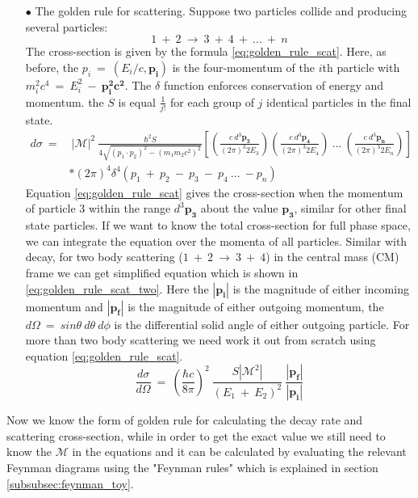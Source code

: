 \begin{itemize}
\item[$\bullet$] The golden rule for scattering.
 Suppose two particles collide and producing several particles:
 \begin{equation}
1~+~2~\rightarrow~3~+~4~+~...~+~n
 \label{eq:two_scat}
\end{equation}
The cross-section is given by the formula \ref{eq:golden_rule_scat}. Here, as before, the $p_{i}~=~(E_{i}/c,\mathbf{p_{i}})$ is the four-momentum of the $i$th particle with $m_{i}^{2}c^{4}~=~E_{i}^{2}~-~\mathbf{p_{i}^{2}c^{2}}$. The $\delta$ function enforces conservation of energy and momentum. the $S$ is equal $\frac{1}{j!}$ for each group of $j$ identical particles in the final state.
\begin{equation}
\begin{split}
d\sigma~=&~|\mathcal{M}|^{2}~\frac{\hbar^{2}S}{4\sqrt{(p_{1}\cdot p_{2})^{2}-(m_{1}m_{2}c^{2})^{2}}}[(\frac{c~d^{3}\mathbf{p_{3}}}{(2\pi)^{3}2E_{3}})(\frac{c~d^{3}\mathbf{p_{4}}}{(2\pi)^{3}2E_{4}})~...~(\frac{c~d^{3}\mathbf{p_{n}}}{(2\pi)^{3}2E_{n}})]\\
&*(2\pi)^{4}\delta^{4}(p_{1}~+~p_{2}~-~p_{3}~-~p_{4}~...~-p_{n})
\end{split}
\label{eq:golden_rule_scat}
\end{equation}
Equation \ref{eq:golden_rule_scat} gives the cross-section when the momentum of particle 3 within the range $d^{3}\mathbf{p_{3}}$ about the value $\mathbf{p_{3}}$, similar for other final state particles. If we want to know the total cross-section for full phase space, we can integrate the equation over the momenta of all particles.
Similar with decay, for two body scattering ($1~+~2~\rightarrow~3~+~4$) in the central mass (CM) frame we can get simplified equation which is shown in \ref{eq:golden_rule_scat_two}. Here the $|\mathbf{p_{i}}|$ is the magnitude of either incoming momentum and $|\mathbf{p_{f}}|$ is the magnitude of either outgoing momentum, the $d\Omega~=~sin\theta~d\theta~d\phi$ is the differential solid angle of either outgoing particle. For more than two body scattering we need work it out from scratch using equation \ref{eq:golden_rule_scat}.
\begin{equation}
\frac{d\sigma}{d\Omega}~=~(\frac{\hbar c}{8\pi})^{2}~\frac{S|\mathcal{M}^{2}|}{(E_{1}~+~E_{2})^{2}}~\frac{|\mathbf{p_{f}}|}{|\mathbf{p_{i}}|}
\label{eq:golden_rule_scat_two}
\end{equation}
\end{itemize}

Now we know the form of golden rule for calculating the decay rate and scattering cross-section, while in order to get the exact value we still need to know the $\mathcal{M}$ in the equations and it can be calculated by evaluating the relevant Feynman diagrams using the "Feynman rules" which is explained in section \ref{subsubsec:feynman_toy}.

